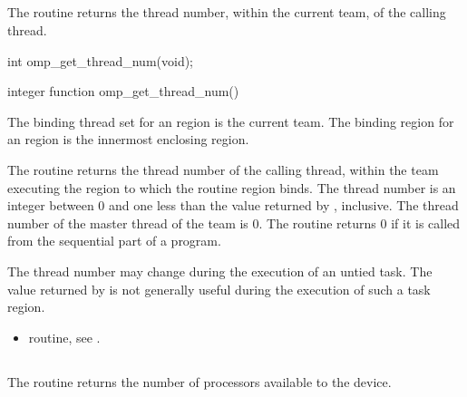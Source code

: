 \subsection{}
\label{subsec:omp_get_thread_num}
\summary
The  routine returns the thread number, within the current
team, of the calling thread.

\format
\begin{ccppspecific}
\begin{ompcFunction}
int omp_get_thread_num(void);
\end{ompcFunction}
\end{ccppspecific}

\begin{fortranspecific}
\begin{ompfFunction}
integer function omp_get_thread_num()
\end{ompfFunction}
\end{fortranspecific}

\binding
The binding thread set for an  region is the current team. The
binding region for an  region is the innermost enclosing
 region.

\effect
The  routine returns the thread number of the calling thread,
within the team executing the  region to which the routine region binds. The
thread number is an integer between 0 and one less than the value returned by
, inclusive. The thread number of the master thread of the
team is 0. The routine returns 0 if it is called from the sequential part of a program.

\begin{note}
The thread number may change during the execution of an untied task. The
value returned by  is not generally useful during the execution
of such a task region.
\end{note}

\crossreferences
\begin{itemize}
\item {} routine, see
.
\end{itemize}








\subsection{}
\label{subsec:omp_get_num_procs}
\summary
The  routine returns the number of processors available to the
device.

